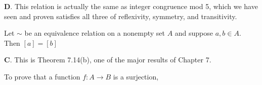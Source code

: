 \documentclass[addpoints]{exam}
\begin{document}
\begin{questions}

\begin{solution}
	\textbf{D}. This relation is actually the same as integer congruence mod 5, which we have seen and proven satisfies all three of reflexivity, symmetry, and transitivity. 
\end{solution}


\question[2] Let $\sim$ be an equivalence relation on a nonempty set $A$ and suppose $a, b \in A$. Then $[a] = [b]$

	\begin{solution}
		\textbf{C}. This is Theorem 7.14(b), one of the major results of Chapter 7. 
	\end{solution}

\question[2] To prove that a function $f: A \to B$  is a surjection,
\end{questions}
\end{document}
